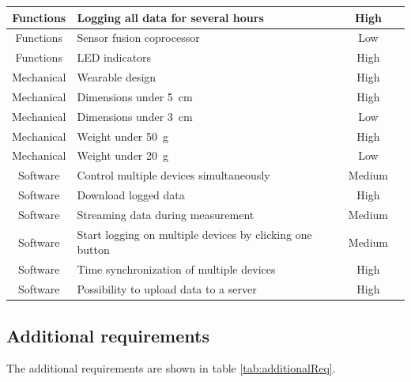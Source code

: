 \begin{table}[]
\begin{tabular}{|c|p{5cm}|c|l|}
Functions & Logging all data for several hours & High &  \\ \hline
Functions & Sensor fusion coprocessor & Low &  \\ \hline
Functions & LED indicators & High &  \\ \hline

Mechanical & Wearable design & High &  \\ \hline
Mechanical & Dimensions under \SI{5}{cm} & High &  \\ \hline
Mechanical & Dimensions under \SI{3}{cm} & Low &  \\ \hline
Mechanical & Weight under \SI{50}{g} & High &  \\ \hline
Mechanical & Weight under \SI{20}{g} & Low &  \\ \hline

Software & Control multiple devices simultaneously & Medium &  \\ \hline
Software & Download logged data & High &  \\ \hline
Software & Streaming data during measurement & Medium &  \\ \hline
Software & Start logging on multiple devices by clicking one button & Medium &  \\ \hline
Software & Time synchronization of multiple devices & High &  \\ \hline
Software & Possibility to upload data to a server & High &  \\ \hline
\end{tabular}
\end{table}

\subsection{Additional requirements}
\label{HWadditionalRequirements}
The additional requirements are shown in table \ref{tab:additionalReq}.

